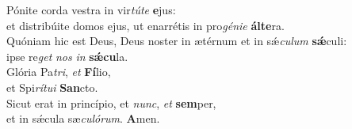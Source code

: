 \evenverse Pónite corda vestra in vir\textit{tú}\textit{te} \textbf{e}jus:~\*\\
\evenverse et distribúite domos ejus, ut enarrétis in pro\textit{gé}\textit{ni}\textit{e} \textbf{ál}\textbf{te}ra.\\
\oddverse Quóniam hic est Deus, Deus noster in ætérnum et in sǽ\textit{cu}\textit{lum} \textbf{sǽ}culi:~\*\\
\oddverse ipse re\textit{get} \textit{nos} \textit{in} \textbf{sǽ}\textbf{cu}la.\\
\evenverse Glória Pa\textit{tri}, \textit{et} \textbf{Fí}lio,~\*\\
\evenverse et Spi\textit{rí}\textit{tu}\textit{i} \textbf{San}cto.\\
\oddverse Sicut erat in princípio, et \textit{nunc}, \textit{et} \textbf{sem}per,~\*\\
\oddverse et in sǽcula sæ\textit{cu}\textit{ló}\textit{rum}. \textbf{A}men.\\

